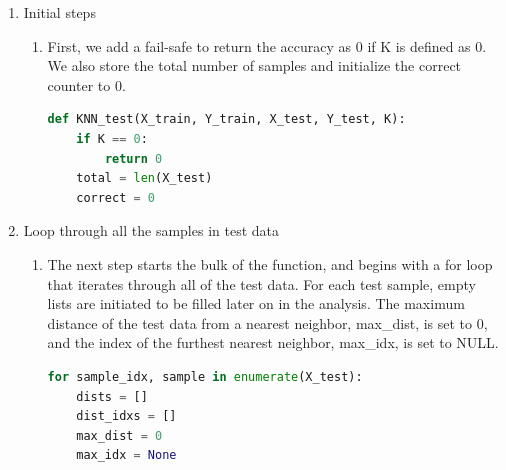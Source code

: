 \documentclass[11pt]{article}
\theoremstyle{definition}
\begin{document}
\begin{enumerate}
 \item Initial steps
 \begin{enumerate}
    \item First, we add a fail-safe to return the accuracy as 0 if K is defined as 0. We also store the \textsf{total} number of samples and initialize the \textsf{correct} counter to 0.
\begin{lstlisting}[language=python, frame=single]
def KNN_test(X_train, Y_train, X_test, Y_test, K):
    if K == 0:
    	return 0
    total = len(X_test)
    correct = 0
\end{lstlisting}    
    \end{enumerate}
 \item Loop through all the samples in test data
 \begin{enumerate}
     \item The next step starts the bulk of the function, and begins with a \textsf{for loop} that iterates through all of the test data. For each test sample, empty lists are initiated to be filled later on in the analysis. The maximum distance of the test data from a nearest neighbor, \textsf{max\_dist}, is set to 0, and the index of the furthest nearest neighbor, \textsf{max\_idx}, is set to NULL. 
\begin{lstlisting}[language=python, frame=single]
for sample_idx, sample in enumerate(X_test):
    dists = []
    dist_idxs = []
    max_dist = 0
    max_idx = None
\end{lstlisting}


\end{enumerate}
\end{enumerate}
\end{document}
